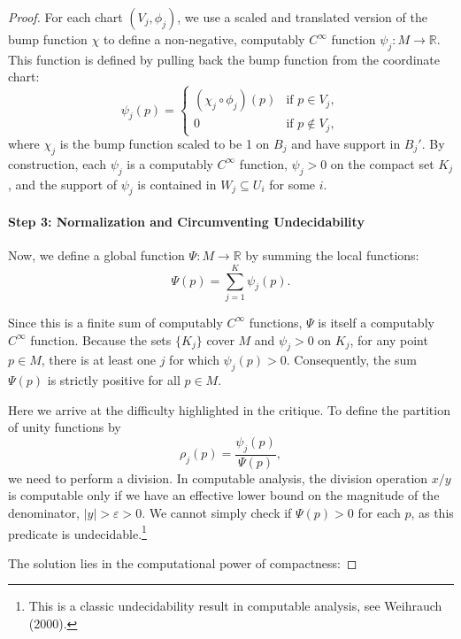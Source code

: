 \documentclass[12pt, a4paper]{article}
\begin{document}
\begin{proof}
For each chart $(V_j, \phi_j)$, we use a scaled and translated version of the bump function $\chi$ to define a non-negative, computably $C^\infty$ function $\psi_j : M \to \mathbb{R}$. This function is defined by pulling back the bump function from the coordinate chart:
\[
\psi_j(p) = 
\begin{cases}
(\chi_j \circ \phi_j)(p) & \text{if } p \in V_j, \\
0 & \text{if } p \notin V_j,
\end{cases}
\]
where $\chi_j$ is the bump function scaled to be 1 on $B_j$ and have support in $B_j'$. By construction, each $\psi_j$ is a computably $C^\infty$ function, $\psi_j > 0$ on the compact set $K_j$, and the support of $\psi_j$ is contained in $W_j \subseteq U_i$ for some $i$.

\paragraph{Step 3: Normalization and Circumventing Undecidability}

Now, we define a global function $\Psi : M \to \mathbb{R}$ by summing the local functions:
\[
\Psi(p) = \sum_{j=1}^K \psi_j(p).
\]

Since this is a finite sum of computably $C^\infty$ functions, $\Psi$ is itself a computably $C^\infty$ function. Because the sets $\{ K_j \}$ cover $M$ and $\psi_j > 0$ on $K_j$, for any point $p \in M$, there is at least one $j$ for which $\psi_j(p) > 0$. Consequently, the sum $\Psi(p)$ is strictly positive for all $p \in M$.

Here we arrive at the difficulty highlighted in the critique. To define the partition of unity functions by
\[
\rho_j(p) = \frac{\psi_j(p)}{\Psi(p)},
\]
we need to perform a division. In computable analysis, the division operation $x/y$ is computable only if we have an effective lower bound on the magnitude of the denominator, $|y| > \varepsilon > 0$. We cannot simply check if $\Psi(p) > 0$ for each $p$, as this predicate is undecidable.\footnote{This is a classic undecidability result in computable analysis, see Weihrauch (2000).}

The solution lies in the computational power of compactness:


\end{proof}
\end{document}
